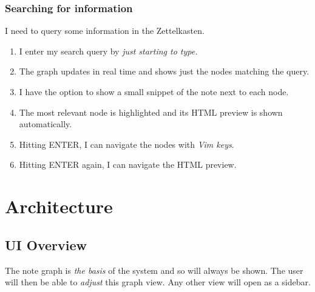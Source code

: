 \documentclass{article}
\begin{document}
\subsubsection{Searching for information}

I need to query some information in the Zettelkasten.

\begin{enumerate}
	\item I enter my search query by \emph{just starting to type.}

	\item The graph updates in real time and shows just the nodes matching the query. 

	\item I have the option to show a small snippet of the note next to each node.

	\item The most relevant node is highlighted and its HTML preview is shown automatically.

	\item Hitting ENTER, I can navigate the nodes with \emph{Vim keys}.

	\item Hitting ENTER again, I can navigate the HTML preview.
\end{enumerate}

\newpage

\section{Architecture}

\subsection{UI Overview}\label{sec:ui_layout}

The note graph is \emph{the basis} of the system and so will always be shown. The user will then be able to \emph{adjust} this graph view. Any other view will open as a sidebar.

\newcommand{\drawborder}{
	\node[fit={(0,0) (\linewidth, 0.5625\linewidth)}, draw=black, thick, outer sep=0](border){};
}

\newcommand{\uicontainer}[3]{
	\node[fit={#1 #2}, inner sep=0, outer sep=0](#3){};
}

\newcommand{\uielement}[5]{
	\uicontainer{#1}{#2}{#4}

	\node[fit={(#4.north west) (#4.south east)}, draw=#3, fill=#3, fill opacity=0.2, thick, inner sep=-0.3]{};
	\node[text=#3] at (#4){#5};
}
\end{document}
